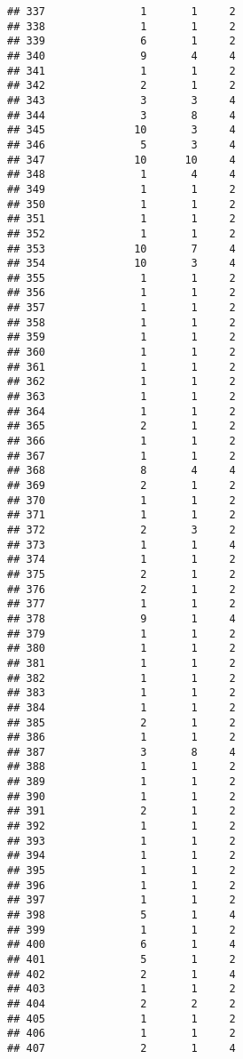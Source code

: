 \documentclass[
]{article}
\begin{document}
\begin{verbatim}
## 337               1       1     2
## 338               1       1     2
## 339               6       1     2
## 340               9       4     4
## 341               1       1     2
## 342               2       1     2
## 343               3       3     4
## 344               3       8     4
## 345              10       3     4
## 346               5       3     4
## 347              10      10     4
## 348               1       4     4
## 349               1       1     2
## 350               1       1     2
## 351               1       1     2
## 352               1       1     2
## 353              10       7     4
## 354              10       3     4
## 355               1       1     2
## 356               1       1     2
## 357               1       1     2
## 358               1       1     2
## 359               1       1     2
## 360               1       1     2
## 361               1       1     2
## 362               1       1     2
## 363               1       1     2
## 364               1       1     2
## 365               2       1     2
## 366               1       1     2
## 367               1       1     2
## 368               8       4     4
## 369               2       1     2
## 370               1       1     2
## 371               1       1     2
## 372               2       3     2
## 373               1       1     4
## 374               1       1     2
## 375               2       1     2
## 376               2       1     2
## 377               1       1     2
## 378               9       1     4
## 379               1       1     2
## 380               1       1     2
## 381               1       1     2
## 382               1       1     2
## 383               1       1     2
## 384               1       1     2
## 385               2       1     2
## 386               1       1     2
## 387               3       8     4
## 388               1       1     2
## 389               1       1     2
## 390               1       1     2
## 391               2       1     2
## 392               1       1     2
## 393               1       1     2
## 394               1       1     2
## 395               1       1     2
## 396               1       1     2
## 397               1       1     2
## 398               5       1     4
## 399               1       1     2
## 400               6       1     4
## 401               5       1     2
## 402               2       1     4
## 403               1       1     2
## 404               2       2     2
## 405               1       1     2
## 406               1       1     2
## 407               2       1     4

\end{verbatim}
\end{document}
